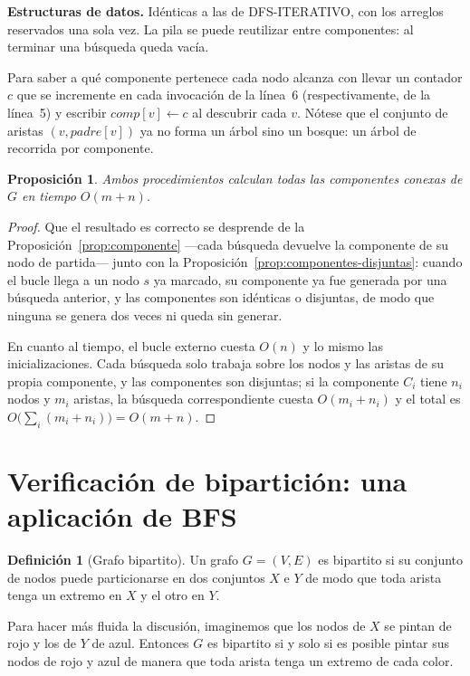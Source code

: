\documentclass[12pt, spanish, oneside, openany]{book}
\newenvironment{estructuras}%
  {\begin{center}\begin{minipage}{0.93\textwidth}\begin{mdframed}[style=estrbox]%
   \small\textbf{Estructuras de datos.}\;}%
  {\end{mdframed}\end{minipage}\end{center}}
\theoremstyle{uprightplain}
\newtheorem{proposicion}[teorema]{Proposición}
\theoremstyle{definition}
\newtheorem{definicion}[teorema]{Definición}
\theoremstyle{remark}
\theoremstyle{definition}
\begin{document}
\begin{estructuras}
Idénticas a las de DFS-ITERATIVO, con los arreglos reservados una sola
vez. La pila se puede reutilizar entre componentes: al terminar una búsqueda
queda vacía.
\end{estructuras}


Para saber a qué componente pertenece cada nodo alcanza con llevar un contador $c$ que se incremente en cada invocación de la línea~6 (respectivamente, de la línea~5) y escribir $\mathit{comp}[v] \leftarrow c$ al descubrir cada $v$. Nótese que el conjunto de aristas $(v,\mathit{padre}[v])$ ya no forma un árbol sino un bosque: un árbol de recorrida por componente.

\begin{proposicion}
\label{prop:componentes-tiempo}
Ambos procedimientos calculan todas las componentes conexas de $G$ en tiempo $O(m+n)$.
\end{proposicion}
\begin{proof}
Que el resultado es correcto se desprende de la Proposición~\ref{prop:componente} ---cada búsqueda devuelve la componente de su nodo de partida--- junto con la Proposición~\ref{prop:componentes-disjuntas}: cuando el bucle llega a un nodo $s$ ya marcado, su componente ya fue generada por una búsqueda anterior, y las componentes son idénticas o disjuntas, de modo que ninguna se genera dos veces ni queda sin generar.

En cuanto al tiempo, el bucle externo cuesta $O(n)$ y lo mismo las inicializaciones. Cada búsqueda solo trabaja sobre los nodos y las aristas de su propia componente, y las componentes son disjuntas; si la componente $C_i$ tiene $n_i$ nodos y $m_i$ aristas, la búsqueda correspondiente cuesta $O(m_i+n_i)$ y el total es $O\big(\sum_i (m_i+n_i)\big) = O(m+n)$.
\end{proof}

\section{Verificación de bipartición: una aplicación de BFS}
\label{sec:bipartito}

\begin{definicion}[Grafo bipartito]
\label{def:bipartito}
Un grafo $G=(V,E)$ es bipartito si su conjunto de nodos puede particionarse en dos conjuntos $X$ e $Y$ de modo que toda arista tenga un extremo en $X$ y el otro en $Y$.
\end{definicion}

Para hacer más fluida la discusión, imaginemos que los nodos de $X$ se pintan de rojo y los de $Y$ de azul. Entonces $G$ es bipartito si y solo si es posible pintar sus nodos de rojo y azul de manera que toda arista tenga un extremo de cada color.
\end{document}
